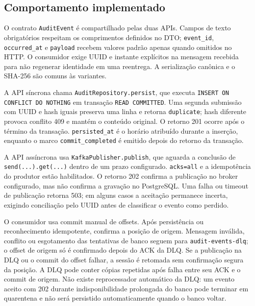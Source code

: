 \subsection{Comportamento implementado}
O contrato \texttt{AuditEvent} é compartilhado pelas duas APIs. Campos de texto obrigatórios respeitam os comprimentos definidos no DTO; \texttt{event\_id}, \texttt{occurred\_at} e \texttt{payload} recebem valores padrão apenas quando omitidos no HTTP. O consumidor exige UUID e instante explícitos na mensagem recebida para não regenerar identidade em uma reentrega. A serialização canônica e o SHA-256 são comuns às variantes.

A API síncrona chama \texttt{AuditRepository.persist}, que executa \texttt{INSERT ON CONFLICT DO NOTHING} em transação \texttt{READ COMMITTED}. Uma segunda submissão com UUID e hash iguais preserva uma linha e retorna \texttt{duplicate}; hash diferente provoca conflito 409 e mantém o conteúdo original. O retorno 201 ocorre após o término da transação. \texttt{persisted\_at} é o horário atribuído durante a inserção, enquanto o marco \texttt{commit\_completed} é emitido depois do retorno da transação.

A API assíncrona usa \texttt{KafkaPublisher.publish}, que aguarda a conclusão de \texttt{send(...).get(...)} dentro de um prazo configurado. \texttt{acks=all} e a idempotência do produtor estão habilitados. O retorno 202 confirma a publicação no broker configurado, mas não confirma a gravação no PostgreSQL. Uma falha ou timeout de publicação retorna 503; em alguns casos a aceitação permanece incerta, exigindo conciliação pelo UUID antes de classificar o evento como perdido.

O consumidor usa commit manual de offsets. Após persistência ou reconhecimento idempotente, confirma a posição de origem. Mensagem inválida, conflito ou esgotamento das tentativas de banco seguem para \texttt{audit-events-dlq}; o offset de origem só é confirmado depois do ACK da DLQ. Se a publicação na DLQ ou o commit do offset falhar, a sessão é retomada sem confirmação segura da posição. A DLQ pode conter cópias repetidas após falha entre seu ACK e o commit de origem. Não existe reprocessador automático da DLQ: um evento aceito com 202 durante indisponibilidade prolongada do banco pode terminar em quarentena e não será persistido automaticamente quando o banco voltar.

